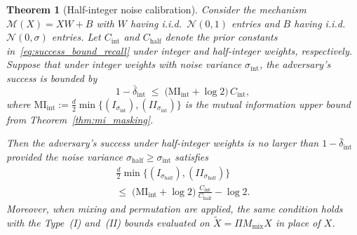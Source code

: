 \documentclass[letterpaper]{article} %
\newtheorem{theorem}{Theorem}
\newcommand{\MI}{\mathrm{MI}}
\begin{document}
\begin{theorem}[Half-integer noise calibration]
\label{thm:half_int_calibration}
Consider the mechanism $\mathcal{M}(X) = XW + B$ with $W$ having i.i.d.\ $\mathcal{N}(0,1)$ entries and $B$ having i.i.d.\ $\mathcal{N}(0,\sigma)$ entries. Let $C_{\mathrm{int}}$ and $C_{\mathrm{half}}$ denote the prior constants in~\eqref{eq:success_bound_recall} under integer and half-integer weights, respectively. Suppose that under integer weights with noise variance $\sigma_{\mathrm{int}}$, the adversary's success is bounded by
\[
1 - \bar{\delta}_{\mathrm{int}}
\;\le\;
\big(\MI_{\mathrm{int}} + \log 2\big)\, C_{\mathrm{int}},
\]
where $\MI_{\mathrm{int}} := \frac{d}{2}\min\{(I_{\sigma_{\mathrm{int}}}),(II_{\sigma_{\mathrm{int}}})\}$ is the mutual information upper bound from Theorem~\ref{thm:mi_masking}.

Then the adversary's success under half-integer weights is no larger than $1 - \bar{\delta}_{\mathrm{int}}$ provided the noise variance $\sigma_{\mathrm{half}} \ge \sigma_{\mathrm{int}}$ satisfies
\begin{multline}
\label{eq:half_calibration}
\frac{d}{2}\min\{(I_{\sigma_{\mathrm{half}}}),(II_{\sigma_{\mathrm{half}}})\}
\\
\le\;
\bigl(\MI_{\mathrm{int}} + \log 2\bigr)\,\frac{C_{\mathrm{int}}}{C_{\mathrm{half}}}
- \log 2.
\end{multline}
Moreover, when mixing and permutation are applied, the same condition holds with the Type~(I) and~(II) bounds evaluated on $\tilde{X} = \Pi M_{\mathrm{mix}} X$ in place of $X$.
\end{theorem}
\end{document}
